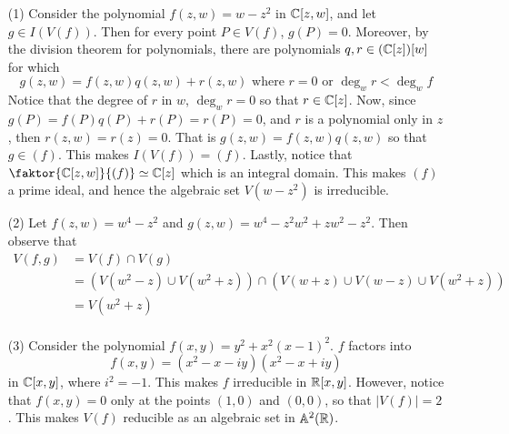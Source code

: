 \begin{example}\label{example_1.9}
    \begin{enumerate}
        \item[(1)] Consider the polynomial $f(z,w)=w-z^2$ in $\mathbb{C}[z,w]$, and let
            $g \in I(V(f))$. Then for every point $P \in V(f)$, $g(P)=0$.
            Moreover, by the division theorem for polynomials, there
            are polynomials $q,r \in
            (\mathbb{C}[z])[w]$ for which
            \begin{equation*}
                g(z,w)=f(z,w)q(z,w)+r(z,w) \text{ where } r=0 \text{ or }
                \deg_w{r} < \deg_w{f}
            \end{equation*}
            Notice that the degree of $r$ in  $w$,  $\deg_w{r}=0$ so that $r \in
            \mathbb{C}[z]$. Now, since $g(P)=f(P)q(P)+r(P)=r(P)=0$, and $r$ is a
            polynomial only in $z$, then $r(z,w)=r(z)=0$. That is
            $g(z,w)=f(z,w)q(z,w)$ so that $g \in (f)$. This makes $I(V(f))=(f)$.
            Lastly, notice that $\faktor{\C[z,w]}{(f)} \simeq \C[z]$ which is an
            integral domain. This makes $(f)$ a prime ideal, and hence the
            algebraic set $V(w-z^2)$ is irreducible.

        \item[(2)] Let $f(z,w)=w^4-z^2$ and $g(z,w)=w^4-z^2w^2+zw^2-z^2$. Then
            observe that
            \begin{align*}
                V(f,g)  &= V(f) \cap V(g) \\
                        &=  (V(w^2-z) \cup V(w^2+z)) \cap
                                (V(w+z) \cup V(w-z) \cup V(w^2+z)) \\
                        &= V(w^2+z) \\
            \end{align*}

        \item[(3)] Consider the polynomial $f(x,y)=y^2+x^2(x-1)^2$. $f$ factors
            into
            \begin{equation*}
                f(x,y)=(x^2-x-iy)(x^2-x+iy)
            \end{equation*}
            in $\mathbb{C}[x,y]$, where $i^2=-1$. This makes $f$ irreducible in $\mathbb{R}[x,y]$.
            However, notice that $f(x,y)=0$ only at the points $(1,0)$ and
            $(0,0)$, so that $|V(f)|=2$. This makes $V(f)$ reducible as an
            algebraic set in $\mathbb{A}^2(\mathbb{R})$.
    \end{enumerate}
\end{example}

